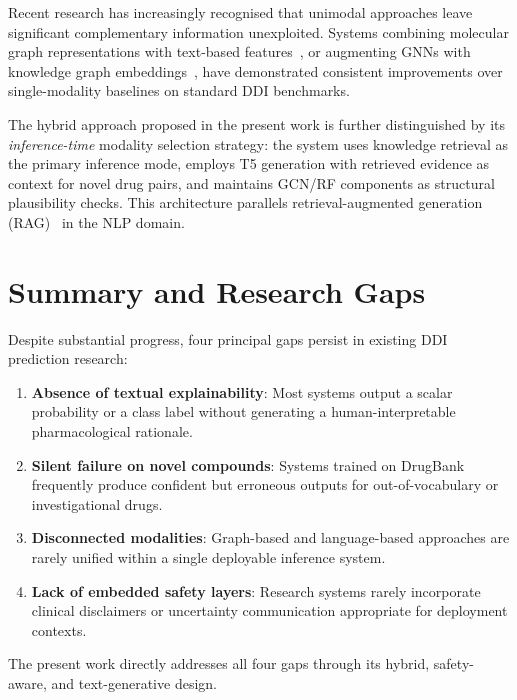 \documentclass[12pt,a4paper,oneside]{report}
\begin{document}
Recent research has increasingly recognised that unimodal approaches leave significant
complementary information unexploited. Systems combining molecular graph representations
with text-based features~\cite{lin2020kgnn}, or augmenting GNNs with knowledge graph
embeddings~\cite{karim2019drug}, have demonstrated consistent improvements over single-modality
baselines on standard DDI benchmarks.

The hybrid approach proposed in the present work is further distinguished by its
\textit{inference-time} modality selection strategy: the system uses knowledge retrieval as
the primary inference mode, employs T5 generation with retrieved evidence as context for
novel drug pairs, and maintains GCN/RF components as structural plausibility checks. This
architecture parallels retrieval-augmented generation (RAG)~\cite{lewis2020retrieval} in
the NLP domain.

\section{Summary and Research Gaps}
\label{sec:gaps}

Despite substantial progress, four principal gaps persist in existing DDI prediction research:

\begin{enumerate}
  \item \textbf{Absence of textual explainability}: Most systems output a scalar probability
  or a class label without generating a human-interpretable pharmacological rationale.
  \item \textbf{Silent failure on novel compounds}: Systems trained on DrugBank frequently
  produce confident but erroneous outputs for out-of-vocabulary or investigational drugs.
  \item \textbf{Disconnected modalities}: Graph-based and language-based approaches are
  rarely unified within a single deployable inference system.
  \item \textbf{Lack of embedded safety layers}: Research systems rarely incorporate
  clinical disclaimers or uncertainty communication appropriate for deployment contexts.
\end{enumerate}

The present work directly addresses all four gaps through its hybrid, safety-aware, and
text-generative design.

\end{document}
